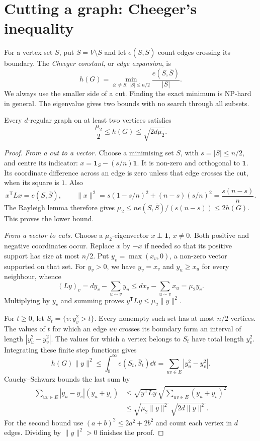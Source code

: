 \section{Cutting a graph: Cheeger's inequality}\label{spectral:sec:cheeger}

For a vertex set $S$, put $\bar S=V\setminus S$ and let $e(S,\bar S)$ count edges crossing its boundary. The \emph{Cheeger constant}, or \emph{edge expansion}, is
\[
h(G)=\min_{\varnothing\ne S,\ |S|\le n/2}\frac{e(S,\bar S)}{|S|}.
\]
We always use the smaller side of a cut. Finding the exact minimum is NP-hard in general. The eigenvalue gives two bounds with no search through all subsets.

\begin{theorem}\label{spectral:thm:cheeger}
Every $d$-regular graph on at least two vertices satisfies
\[
\frac{\mu_2}{2}\le h(G)\le\sqrt{2d\mu_2}.
\]
\end{theorem}
\begin{proof}
\emph{From a cut to a vector.} Choose a minimising set $S$, with $s=|S|\le n/2$, and centre its indicator:
$x=\mathbf1_S-(s/n)\mathbf1$.
It is non-zero and orthogonal to $\mathbf1$. Its coordinate difference across an edge is zero unless that edge crosses the cut, when its square is $1$. Also
\[
x^{\mathsf T}Lx=e(S,\bar S),\qquad
\|x\|^2=s(1-s/n)^2+(n-s)(s/n)^2=\frac{s(n-s)}n.
\]
The Rayleigh lemma therefore gives
$\mu_2\le ne(S,\bar S)/(s(n-s))\le2h(G)$.
This proves the lower bound.

\emph{From a vector to cuts.} Choose a $\mu_2$-eigenvector $x\perp\mathbf1$, $x\ne0$. Both positive and negative coordinates occur. Replace $x$ by $-x$ if needed so that its positive support has size at most $n/2$. Put $y_v=\max(x_v,0)$, a non-zero vector supported on that set.
For $y_v>0$, we have $y_v=x_v$ and $y_u\ge x_u$ for every neighbour, whence
\[
(Ly)_v=dy_v-\sum_{u\sim v}y_u\le dx_v-\sum_{u\sim v}x_u=\mu_2y_v.
\]
Multiplying by $y_v$ and summing proves $y^{\mathsf T}Ly\le\mu_2\|y\|^2$.

For $t\ge0$, let $S_t=\{v:y_v^2>t\}$. Every nonempty such set has at most $n/2$ vertices. The values of $t$ for which an edge $uv$ crosses its boundary form an interval of length $|y_u^2-y_v^2|$. The values for which a vertex belongs to $S_t$ have total length $y_v^2$. Integrating these finite step functions gives
\[
h(G)\|y\|^2\le\int_0^\infty e(S_t,\bar S_t)\dd t
=\sum_{uv\in E}|y_u^2-y_v^2|.
\]
Cauchy--Schwarz bounds the last sum by
\[
\begin{aligned}
\sum_{uv\in E}|y_u-y_v|(y_u+y_v)
&\le\sqrt{y^{\mathsf T}Ly}\,
 \sqrt{\sum_{uv\in E}(y_u+y_v)^2}\\
&\le\sqrt{\mu_2\|y\|^2}\,\sqrt{2d\|y\|^2}.
\end{aligned}
\]
For the second bound use $(a+b)^2\le2a^2+2b^2$ and count each vertex in $d$ edges. Dividing by $\|y\|^2>0$ finishes the proof.
\end{proof}

